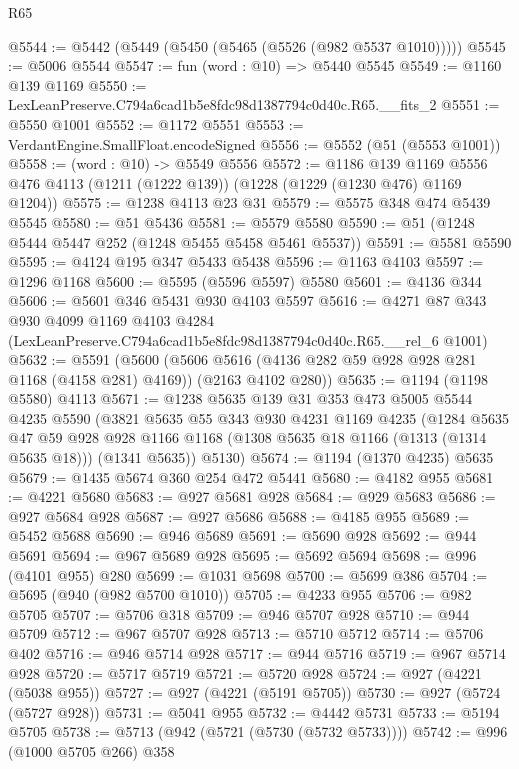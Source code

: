 \begin{lexlean}{R65}
\begin{coremodule}
@5544 := @5442 (@5449 (@5450 (@5465 (@5526 (@982 @5537 @1010)))))
@5545 := @5006 @5544
@5547 := fun (word : @10) => @5440 @5545
@5549 := @1160 @139 @1169
@5550 := LexLeanPreserve.C794a6cad1b5e8fdc98d1387794c0d40c.R65.__fits_2
@5551 := @5550 @1001
@5552 := @1172 @5551
@5553 := VerdantEngine.SmallFloat.encodeSigned
@5556 := @5552 (@51 (@5553 @1001))
@5558 := (word : @10) -> @5549 @5556
@5572 := @1186
    @139
    @1169
    @5556
    @476
    @4113
    (@1211 (@1222 @139))
    (@1228 (@1229 (@1230 @476) @1169 @1204))
@5575 := @1238 @4113 @23 @31
@5579 := @5575 @348 @474 @5439 @5545
@5580 := @51 @5436
@5581 := @5579 @5580
@5590 := @51 (@1248 @5444 @5447 @252 (@1248 @5455 @5458 @5461 @5537))
@5591 := @5581 @5590
@5595 := @4124 @195 @347 @5433 @5438
@5596 := @1163 @4103
@5597 := @1296 @1168
@5600 := @5595 (@5596 @5597) @5580
@5601 := @4136 @344
@5606 := @5601 @346 @5431 @930 @4103 @5597
@5616 := @4271
    @87
    @343
    @930
    @4099
    @1169
    @4103
    @4284
    (LexLeanPreserve.C794a6cad1b5e8fdc98d1387794c0d40c.R65.__rel_6 @1001)
@5632 := @5591
    (@5600
      (@5606 @5616 (@4136 @282 @59 @928 @928 @281 @1168 (@4158 @281) @4169))
      (@2163 @4102 @280))
@5635 := @1194 (@1198 @5580) @4113
@5671 := @1238
    @5635
    @139
    @31
    @353
    @473
    @5005
    @5544
    @4235
    @5590
    (@3821
      @5635
      @55
      @343
      @930
      @4231
      @1169
      @4235
      (@1284
        @5635
        @47
        @59
        @928
        @928
        @1166
        @1168
        (@1308 @5635 @18 @1166 (@1313 (@1314 @5635 @18)))
        (@1341 @5635))
      @5130)
@5674 := @1194 (@1370 @4235) @5635
@5679 := @1435 @5674 @360 @254 @472 @5441
@5680 := @4182 @955
@5681 := @4221 @5680
@5683 := @927 @5681 @928
@5684 := @929 @5683
@5686 := @927 @5684 @928
@5687 := @927 @5686
@5688 := @4185 @955
@5689 := @5452 @5688
@5690 := @946 @5689
@5691 := @5690 @928
@5692 := @944 @5691
@5694 := @967 @5689 @928
@5695 := @5692 @5694
@5698 := @996 (@4101 @955) @280
@5699 := @1031 @5698
@5700 := @5699 @386
@5704 := @5695 (@940 (@982 @5700 @1010))
@5705 := @4233 @955
@5706 := @982 @5705
@5707 := @5706 @318
@5709 := @946 @5707 @928
@5710 := @944 @5709
@5712 := @967 @5707 @928
@5713 := @5710 @5712
@5714 := @5706 @402
@5716 := @946 @5714 @928
@5717 := @944 @5716
@5719 := @967 @5714 @928
@5720 := @5717 @5719
@5721 := @5720 @928
@5724 := @927 (@4221 (@5038 @955))
@5727 := @927 (@4221 (@5191 @5705))
@5730 := @927 (@5724 (@5727 @928))
@5731 := @5041 @955
@5732 := @4442 @5731
@5733 := @5194 @5705
@5738 := @5713 (@942 (@5721 (@5730 (@5732 @5733))))
@5742 := @996 (@1000 @5705 @266) @358

\end{coremodule}
\end{lexlean}
